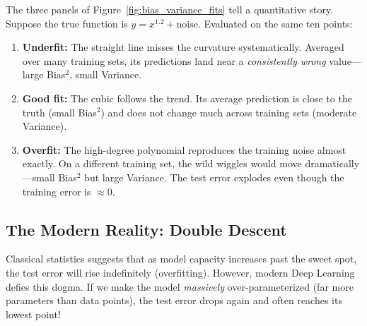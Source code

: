 \documentclass{tufte-handout}
\begin{document}
\begin{exmp}
The three panels of Figure~\ref{fig:bias_variance_fits} tell a quantitative story. Suppose the true function is $y = x^{1.2} + \text{noise}$. Evaluated on the same ten points:
\begin{enumerate}[leftmargin=*, itemsep=2pt]
    \item \textbf{Underfit:} The straight line misses the curvature systematically. Averaged over many training sets, its predictions land near a \emph{consistently wrong} value---large Bias$^2$, small Variance.
    \item \textbf{Good fit:} The cubic follows the trend. Its average prediction is close to the truth (small Bias$^2$) and does not change much across training sets (moderate Variance).
    \item \textbf{Overfit:} The high-degree polynomial reproduces the training noise almost exactly. On a different training set, the wild wiggles would move dramatically---small Bias$^2$ but large Variance. The test error explodes even though the training error is $\approx 0$.
\end{enumerate}
\end{exmp}

\subsection{The Modern Reality: Double Descent}

Classical statistics suggests that as model capacity increases past the sweet spot, the test error will rise indefinitely (overfitting). However, modern Deep Learning defies this dogma. If we make the model \textit{massively} over-parameterized (far more parameters than data points), the test error drops again and often reaches its lowest point!
\end{document}
